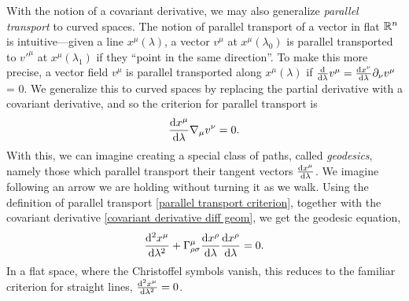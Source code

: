 %
With the notion of a covariant derivative, we may also generalize \emph{parallel transport} to curved spaces.
The notion of parallel transport of a vector in flat $\mathbb{R}^n$ is intuitive---given a line $x^\mu(\lambda)$, a vector $v^\mu$ at $x^\mu(\lambda_0)$ is parallel transported to $v'^\mu$ at $x^\mu(\lambda_1)$ if they ``point in the same direction''.
To make this more precise, a vector field $v^\mu$ is parallel transported along $x^\mu(\lambda)$ if $\odv{}{\lambda} v^\mu = \odv{x^\nu}{\lambda} \partial_\nu v^\mu$ = 0.
We generalize this to curved spaces by replacing the partial derivative with a covariant derivative, and so the criterion for parallel transport is
%
\begin{equation}
    \label{parallel transport criterion}
    \odv{x^\mu}{\lambda} \nabla_\mu v^\nu = 0.
\end{equation}
%
With this, we can imagine creating a special class of paths, called \emph{geodesics}, namely those which parallel transport their tangent vectors $\odv{x^\mu}{\lambda}$.
We imagine following an arrow we are holding without turning it as we walk.
Using the definition of parallel transport \autoref{parallel transport criterion}, together with the covariant derivative \autoref{covariant derivative diff geom}, we get the geodesic equation,
%
\begin{equation}
    \label{goedesic equation}
    \odv[2]{x^\mu}{\lambda} 
    + \Gamma^\mu_{\rho \sigma} \odv{x^\rho}{\lambda} \odv{x^\rho}{\lambda}
    = 0.
\end{equation}
In a flat space, where the Christoffel symbols vanish, this reduces to the familiar criterion for straight lines, $\odv[2]{x^\mu}{\lambda} = 0$.

